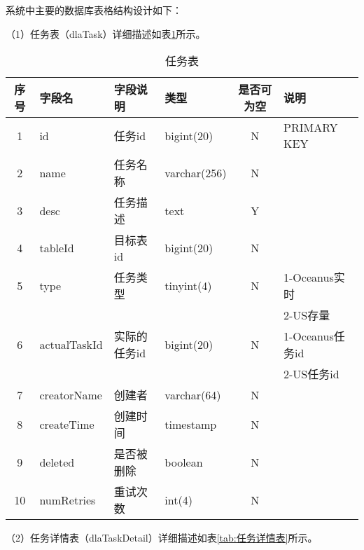 系统中主要的数据库表格结构设计如下：

（1）任务表（dlaTask）详细描述如表\ref{tab:任务表}所示。

\begin{table}[H]
  \centering
  \caption{任务表}
  \label{tab:任务表}
  \begin{tabular}{clllcl}
    \toprule
    序号  & 字段名         & 字段说明     & 类型           & 是否可为空   & 说明  \\
    \midrule
    1    & id            & 任务id      & bigint(20)     & N          & PRIMARY KEY    \\
    2    & name          & 任务名称     & varchar(256)   & N          &     \\
    3    & desc          & 任务描述     & text           & Y          &   \\
    4    & tableId       & 目标表id     & bigint(20)     & N          &   \\
    5    & type          & 任务类型     & tinyint(4)     & N          & 1-Oceanus实时  \\
         &               &             &               &             & 2-US存量  \\
    6    & actualTaskId  & 实际的任务id  & bigint(20)    & N          &  1-Oceanus任务id  \\
         &               &             &               &             & 2-US任务id  \\
    7    & creatorName   & 创建者       & varchar(64)    & N          &   \\
    8    & createTime    & 创建时间     & timestamp      & N          &   \\
    9    & deleted       & 是否被删除    & boolean        & N          &   \\
    10   & numRetries    & 重试次数      & int(4)        & N          &   \\
    \bottomrule
  \end{tabular}
\end{table}

（2）任务详情表（dlaTaskDetail）详细描述如表\ref{tab:任务详情表}所示。

